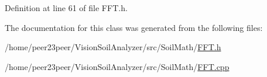 Definition at line 61 of file F\+F\+T.\+h.



The documentation for this class was generated from the following files\+:\begin{DoxyCompactItemize}
\item 
/home/peer23peer/\+Vision\+Soil\+Analyzer/src/\+Soil\+Math/\hyperlink{_f_f_t_8h}{F\+F\+T.\+h}\item 
/home/peer23peer/\+Vision\+Soil\+Analyzer/src/\+Soil\+Math/\hyperlink{_f_f_t_8cpp}{F\+F\+T.\+cpp}\end{DoxyCompactItemize}
